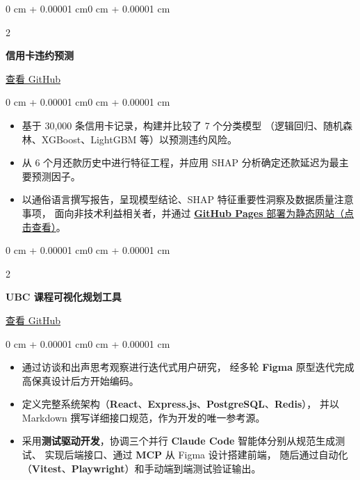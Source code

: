 \documentclass[10pt, letterpaper]{article}
\newenvironment{highlights}{
    \begin{itemize}[
        topsep=0.10 cm,
        parsep=0.10 cm,
        partopsep=0pt,
        itemsep=0pt,
        leftmargin=0 cm + 10pt
    ]
}{
    \end{itemize}
}
\newenvironment{onecolentry}{
    \begin{adjustwidth}{0 cm + 0.00001 cm}{0 cm + 0.00001 cm}
}{
    \end{adjustwidth}
}
\newenvironment{twocolentry}[2][]{
    \onecolentry
    \def\secondColumn{#2}
    \setcolumnwidth{\fill, 4.5 cm}
    \begin{paracol}{2}
}{
    \switchcolumn \raggedleft \secondColumn
    \end{paracol}
    \endonecolentry
}
\begin{document}
    \vspace{0.2 cm}

    \begin{twocolentry}{\href{https://github.com/DavidHua04/CreditCardDefaultPost.github.io}{查看 GitHub}}
        \textbf{信用卡违约预测}
    \end{twocolentry}

    \vspace{0.10 cm}
    \begin{onecolentry}
        \begin{highlights}
            \item 基于 30,000 条信用卡记录，构建并比较了 7 个分类模型
            （逻辑回归、随机森林、XGBoost、LightGBM 等）以预测违约风险。
            \item 从 6 个月还款历史中进行特征工程，并应用 SHAP 分析确定还款延迟为最主要预测因子。
            \item 以通俗语言撰写报告，呈现模型结论、SHAP 特征重要性洞察及数据质量注意事项，
            面向非技术利益相关者，并通过 \href{https://davidhua04.github.io/CreditCardDefaultPost.github.io/}{\textbf{GitHub Pages} 部署为静态网站（点击查看）}。
        \end{highlights}
    \end{onecolentry}

    \vspace{0.2 cm}

    \begin{twocolentry}{\href{https://github.com/DavidHua04/UBC-Courses-Visualization}{查看 GitHub}}
        \textbf{UBC 课程可视化规划工具}
    \end{twocolentry}

    \vspace{0.10 cm}
    \begin{onecolentry}
        \begin{highlights}
            \item 通过访谈和出声思考观察进行迭代式用户研究，
            经多轮 \textbf{Figma} 原型迭代完成高保真设计后方开始编码。
            \item 定义完整系统架构（\textbf{React}、\textbf{Express.js}、\textbf{PostgreSQL}、\textbf{Redis}），
            并以 Markdown 撰写详细接口规范，作为开发的唯一参考源。
            \item 采用\textbf{测试驱动开发}，协调三个并行 \textbf{Claude Code} 智能体分别从规范生成测试、
            实现后端接口、通过 \textbf{MCP} 从 Figma 设计搭建前端，
            随后通过自动化（\textbf{Vitest}、\textbf{Playwright}）和手动端到端测试验证输出。
        \end{highlights}
    \end{onecolentry}
\end{document}
